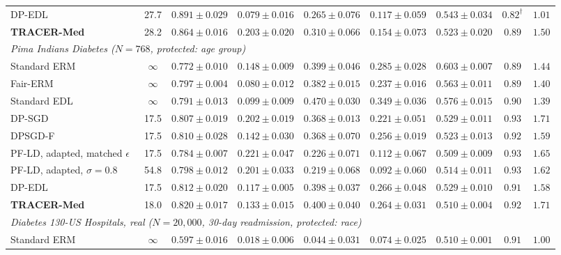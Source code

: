 \documentclass[3p,12pt]{elsarticle}
\theoremstyle{plain}
\theoremstyle{definition}
\begin{document}
\begin{table}[t]
{\begin{tabular}{lcccccccc}
DP-EDL & 27.7 & $0.891 \pm 0.029$ & $\mathbf{0.079} \pm \mathbf{0.016}$ & $\mathbf{0.265} \pm \mathbf{0.076}$ & $0.117 \pm 0.059$ & $0.543 \pm 0.034$ & $0.82^\dagger$ & $1.01$ \\
\textbf{TRACER-Med} & 28.2 & $0.864 \pm 0.016$ & $0.203 \pm 0.020$ & $0.310 \pm 0.066$ & $0.154 \pm 0.073$ & $0.523 \pm 0.020$ & $0.89$ & $1.50$ \\
\midrule
\multicolumn{9}{l}{\emph{Pima Indians Diabetes ($N=768$, protected: age group)}} \\
Standard ERM & $\infty$ & $0.772 \pm 0.010$ & $0.148 \pm 0.009$ & $0.399 \pm 0.046$ & $0.285 \pm 0.028$ & $0.603 \pm 0.007$ & $0.89$ & $1.44$ \\
Fair-ERM & $\infty$ & $0.797 \pm 0.004$ & $0.080 \pm 0.012$ & $0.382 \pm 0.015$ & $0.237 \pm 0.016$ & $0.563 \pm 0.011$ & $0.89$ & $1.40$ \\
Standard EDL & $\infty$ & $0.791 \pm 0.013$ & $0.099 \pm 0.009$ & $0.470 \pm 0.030$ & $0.349 \pm 0.036$ & $0.576 \pm 0.015$ & $0.90$ & $1.39$ \\
DP-SGD & 17.5 & $0.807 \pm 0.019$ & $0.202 \pm 0.019$ & $0.368 \pm 0.013$ & $0.221 \pm 0.051$ & $0.529 \pm 0.011$ & $0.93$ & $1.71$ \\
DPSGD-F~\cite{xu2021removing} & 17.5 & $0.810 \pm 0.028$ & $0.142 \pm 0.030$ & $0.368 \pm 0.070$ & $0.256 \pm 0.019$ & $0.523 \pm 0.013$ & $0.92$ & $1.59$ \\
PF-LD, adapted, matched $\epsilon$~\cite{tran2021differentially} & 17.5 & $0.784 \pm 0.007$ & $0.221 \pm 0.047$ & $\mathbf{0.226} \pm \mathbf{0.071}$ & $\mathbf{0.112} \pm \mathbf{0.067}$ & $\mathbf{0.509} \pm \mathbf{0.009}$ & $0.93$ & $1.65$ \\
PF-LD, adapted, $\sigma=0.8$~\cite{tran2021differentially} & 54.8 & $0.798 \pm 0.012$ & $0.201 \pm 0.033$ & $0.219 \pm 0.068$ & $0.092 \pm 0.060$ & $0.514 \pm 0.011$ & $0.93$ & $1.62$ \\
DP-EDL & 17.5 & $0.812 \pm 0.020$ & $\mathbf{0.117} \pm \mathbf{0.005}$ & $0.398 \pm 0.037$ & $0.266 \pm 0.048$ & $0.529 \pm 0.010$ & $0.91$ & $1.58$ \\
\textbf{TRACER-Med} & 18.0 & $\mathbf{0.820} \pm \mathbf{0.017}$ & $0.133 \pm 0.015$ & $0.400 \pm 0.040$ & $0.264 \pm 0.031$ & $0.510 \pm 0.004$ & $0.92$ & $1.71$ \\
\midrule
\multicolumn{9}{l}{\emph{Diabetes 130-US Hospitals, real ($N=20{,}000$, 30-day readmission, protected: race)}} \\
Standard ERM & $\infty$ & $0.597 \pm 0.016$ & $0.018 \pm 0.006$ & $0.044 \pm 0.031$ & $0.074 \pm 0.025$ & $0.510 \pm 0.001$ & $0.91$ & $1.00$ \\

\end{tabular}}
\end{table}
\end{document}
